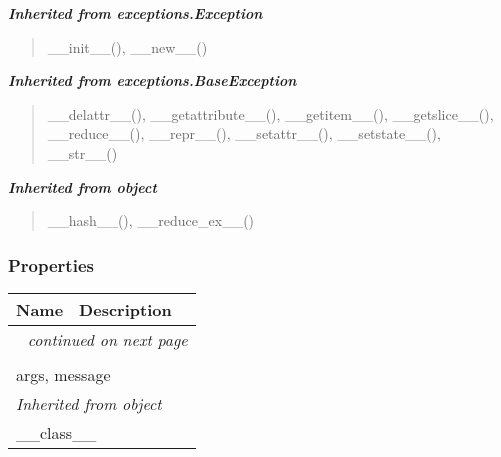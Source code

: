 \large{\textbf{\textit{Inherited from exceptions.Exception}}}

\begin{quote}
\_\_init\_\_(), \_\_new\_\_()
\end{quote}

\large{\textbf{\textit{Inherited from exceptions.BaseException}}}

\begin{quote}
\_\_delattr\_\_(), \_\_getattribute\_\_(), \_\_getitem\_\_(), \_\_getslice\_\_(), \_\_reduce\_\_(), \_\_repr\_\_(), \_\_setattr\_\_(), \_\_setstate\_\_(), \_\_str\_\_()
\end{quote}

\large{\textbf{\textit{Inherited from object}}}

\begin{quote}
\_\_hash\_\_(), \_\_reduce\_ex\_\_()
\end{quote}


  \subsubsection{Properties}

    \vspace{-1cm}
\hspace{\varindent}\begin{longtable}{|p{\varnamewidth}|p{\vardescrwidth}|l}
\cline{1-2}
\cline{1-2} \centering \textbf{Name} & \centering \textbf{Description}& \\
\cline{1-2}
\endhead\cline{1-2}\multicolumn{3}{r}{\small\textit{continued on next page}}\\\endfoot\cline{1-2}
\endlastfoot\multicolumn{2}{|l|}{\textit{Inherited from exceptions.BaseException}}\\
\multicolumn{2}{|p{\varwidth}|}{\raggedright args, message}\\
\cline{1-2}
\multicolumn{2}{|l|}{\textit{Inherited from object}}\\
\multicolumn{2}{|p{\varwidth}|}{\raggedright \_\_class\_\_}\\
\cline{1-2}
\end{longtable}


